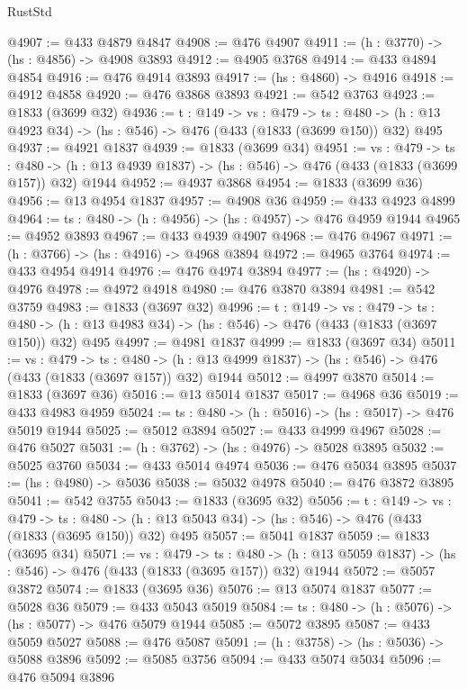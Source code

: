 \begin{lexlean}{RustStd}
\begin{coremodule}
@4907 := @433 @4879 @4847
@4908 := @476 @4907
@4911 := (h : @3770) -> (hs : @4856) -> @4908 @3893
@4912 := @4905 @3768
@4914 := @433 @4894 @4854
@4916 := @476 @4914 @3893
@4917 := (hs : @4860) -> @4916
@4918 := @4912 @4858
@4920 := @476 @3868 @3893
@4921 := @542 @3763
@4923 := @1833 (@3699 @32)
@4936 := {t : @149} ->
  {vs : @479} ->
  {ts : @480} -> (h : @13 @4923 @34) -> (hs : @546) -> @476 (@433 (@1833 (@3699 @150)) @32) @495
@4937 := @4921 @1837
@4939 := @1833 (@3699 @34)
@4951 := {vs : @479} ->
  {ts : @480} -> (h : @13 @4939 @1837) -> (hs : @546) -> @476 (@433 (@1833 (@3699 @157)) @32) @1944
@4952 := @4937 @3868
@4954 := @1833 (@3699 @36)
@4956 := @13 @4954 @1837
@4957 := @4908 @36
@4959 := @433 @4923 @4899
@4964 := {ts : @480} -> (h : @4956) -> (hs : @4957) -> @476 @4959 @1944
@4965 := @4952 @3893
@4967 := @433 @4939 @4907
@4968 := @476 @4967
@4971 := (h : @3766) -> (hs : @4916) -> @4968 @3894
@4972 := @4965 @3764
@4974 := @433 @4954 @4914
@4976 := @476 @4974 @3894
@4977 := (hs : @4920) -> @4976
@4978 := @4972 @4918
@4980 := @476 @3870 @3894
@4981 := @542 @3759
@4983 := @1833 (@3697 @32)
@4996 := {t : @149} ->
  {vs : @479} ->
  {ts : @480} -> (h : @13 @4983 @34) -> (hs : @546) -> @476 (@433 (@1833 (@3697 @150)) @32) @495
@4997 := @4981 @1837
@4999 := @1833 (@3697 @34)
@5011 := {vs : @479} ->
  {ts : @480} -> (h : @13 @4999 @1837) -> (hs : @546) -> @476 (@433 (@1833 (@3697 @157)) @32) @1944
@5012 := @4997 @3870
@5014 := @1833 (@3697 @36)
@5016 := @13 @5014 @1837
@5017 := @4968 @36
@5019 := @433 @4983 @4959
@5024 := {ts : @480} -> (h : @5016) -> (hs : @5017) -> @476 @5019 @1944
@5025 := @5012 @3894
@5027 := @433 @4999 @4967
@5028 := @476 @5027
@5031 := (h : @3762) -> (hs : @4976) -> @5028 @3895
@5032 := @5025 @3760
@5034 := @433 @5014 @4974
@5036 := @476 @5034 @3895
@5037 := (hs : @4980) -> @5036
@5038 := @5032 @4978
@5040 := @476 @3872 @3895
@5041 := @542 @3755
@5043 := @1833 (@3695 @32)
@5056 := {t : @149} ->
  {vs : @479} ->
  {ts : @480} -> (h : @13 @5043 @34) -> (hs : @546) -> @476 (@433 (@1833 (@3695 @150)) @32) @495
@5057 := @5041 @1837
@5059 := @1833 (@3695 @34)
@5071 := {vs : @479} ->
  {ts : @480} -> (h : @13 @5059 @1837) -> (hs : @546) -> @476 (@433 (@1833 (@3695 @157)) @32) @1944
@5072 := @5057 @3872
@5074 := @1833 (@3695 @36)
@5076 := @13 @5074 @1837
@5077 := @5028 @36
@5079 := @433 @5043 @5019
@5084 := {ts : @480} -> (h : @5076) -> (hs : @5077) -> @476 @5079 @1944
@5085 := @5072 @3895
@5087 := @433 @5059 @5027
@5088 := @476 @5087
@5091 := (h : @3758) -> (hs : @5036) -> @5088 @3896
@5092 := @5085 @3756
@5094 := @433 @5074 @5034
@5096 := @476 @5094 @3896

\end{coremodule}
\end{lexlean}
